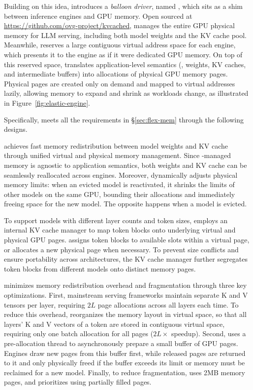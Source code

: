 Building on this idea, \tool introduces a \emph{balloon driver}, named , which sits as a shim between inference engines and GPU memory. 
Open sourced at \url{https://github.com/ovg-project/kvcached},  manages the entire GPU physical memory for LLM serving, including both model weights and the KV cache pool.
Meanwhile,  reserves a large contiguous virtual address space for each engine, which presents it to the engine as if it were dedicated GPU memory. 
On top of this reserved space,  translates application-level semantics (\eg, weights, KV caches, and intermediate buffers) into allocations of physical GPU memory pages. 
Physical pages are created only on demand and mapped to virtual addresses lazily,
allowing memory to expand and shrink as workloads change, as illustrated in Figure~\ref{fig:elastic-engine}. 

Specifically,  meets all the requirements in \S\ref{sec:flex-mem} through the following designs.

 achieves fast memory redistribution between model weights and KV cache through unified virtual and physical memory management. 
Since -managed memory is agnostic to application semantics, both weights and KV cache can be seamlessly reallocated across engines.
Moreover,  dynamically adjusts physical memory 
limits: when an evicted model is reactivated, it shrinks the limits of other models on the same GPU, bounding their allocations and immediately freeing space for the new model.
The opposite happens when a model is evicted.

To support models with different layer counts and token sizes,  employs an internal KV cache manager to map token blocks onto underlying virtual and physical GPU pages. \tool assigns token blocks to available slots within a virtual page, or allocates a new physical page when necessary. To prevent size conflicts and ensure portability across architectures, the KV cache manager further segregates token blocks from different models onto distinct memory pages.

 minimizes memory redistribution overhead and fragmentation through three key optimizations.
First, mainstream serving frameworks maintain separate K and V tensors per layer, 
requiring $2L$ page allocations across all layers each time. To reduce this overhead,  reorganizes the memory layout in virtual space, so that all layers' K and V vectors of a token are stored in contiguous virtual space, requiring only one batch allocation for all pages ($2L\times$ speedup). 
Second,  uses a pre-allocation thread to asynchronously prepare a small buffer of GPU pages. Engines draw new pages from this buffer first, while released pages are returned to it and only physically freed if the buffer exceeds its limit or memory must be reclaimed for a new model.
Finally, to reduce fragmentation,  uses 2MB memory pages, and prioritizes using partially filled pages.

